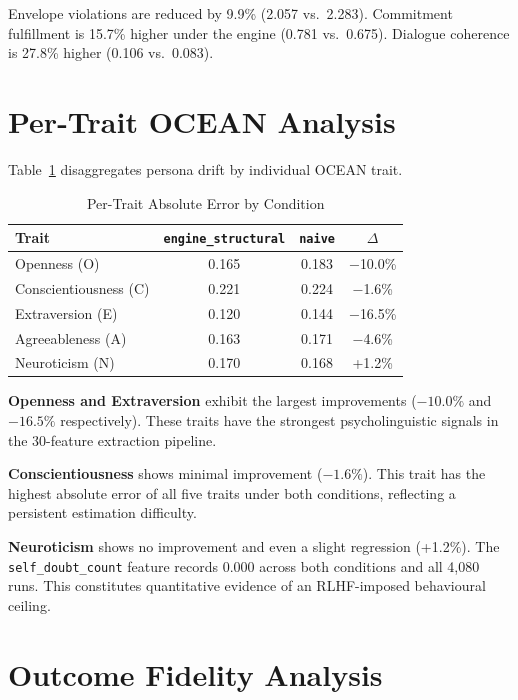 \documentclass[12pt, a4paper]{report}
\newcommand{\engine}{\texttt{engine\_structural}}
\newcommand{\naive}{\texttt{naive}}
\begin{document}
Envelope violations are reduced by 9.9\% (2.057 vs.\ 2.283). Commitment fulfillment is 15.7\% higher under the engine (0.781 vs.\ 0.675). Dialogue coherence is 27.8\% higher (0.106 vs.\ 0.083).


\section{Per-Trait OCEAN Analysis}

Table~\ref{tab:pertrait} disaggregates persona drift by individual OCEAN trait.

\begin{table}[t]
\centering
\caption{Per-Trait Absolute Error by Condition}
\label{tab:pertrait}
\begin{tabular}{lccc}
\toprule
Trait & \engine & \naive & $\Delta$ \\
\midrule
Openness (O)          & \cellcolor{better} 0.165 & 0.183 & $-$10.0\% \\
Conscientiousness (C) & \cellcolor{better} 0.221 & 0.224 & $-$1.6\% \\
Extraversion (E)      & \cellcolor{better} 0.120 & 0.144 & $-$16.5\% \\
Agreeableness (A)     & \cellcolor{better} 0.163 & 0.171 & $-$4.6\% \\
Neuroticism (N)       & 0.170          & \cellcolor{better} 0.168 & +1.2\% \\
\bottomrule
\end{tabular}
\end{table}

\textbf{Openness and Extraversion} exhibit the largest improvements ($-10.0\%$ and $-16.5\%$ respectively). These traits have the strongest psycholinguistic signals in the 30-feature extraction pipeline.

\textbf{Conscientiousness} shows minimal improvement ($-1.6\%$). This trait has the highest absolute error of all five traits under both conditions, reflecting a persistent estimation difficulty.

\textbf{Neuroticism} shows no improvement and even a slight regression (+1.2\%). The \texttt{self\_doubt\_count} feature records 0.000 across both conditions and all 4,080 runs. This constitutes quantitative evidence of an RLHF-imposed behavioural ceiling.


\section{Outcome Fidelity Analysis}
\end{document}
